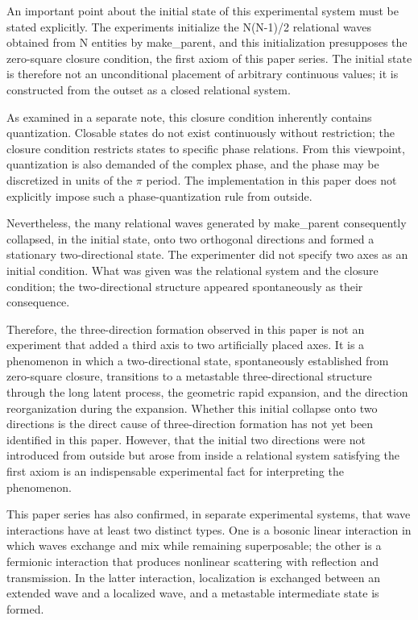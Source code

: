 \documentclass[
  a4paper,
]{article}
\begin{document}
An important point about the initial state of this experimental system
must be stated explicitly. The experiments initialize the N(N-1)/2
relational waves obtained from N entities by make\_parent, and this
initialization presupposes the zero-square closure condition, the first
axiom of this paper series. The initial state is therefore not an
unconditional placement of arbitrary continuous values; it is
constructed from the outset as a closed relational system.

As examined in a separate note, this closure condition inherently
contains quantization. Closable states do not exist continuously without
restriction; the closure condition restricts states to specific phase
relations. From this viewpoint, quantization is also demanded of the
complex phase, and the phase may be discretized in units of the \(\pi\)
period. The implementation in this paper does not explicitly impose such
a phase-quantization rule from outside.

Nevertheless, the many relational waves generated by make\_parent
consequently collapsed, in the initial state, onto two orthogonal
directions and formed a stationary two-directional state. The
experimenter did not specify two axes as an initial condition. What was
given was the relational system and the closure condition; the
two-directional structure appeared spontaneously as their consequence.

Therefore, the three-direction formation observed in this paper is not
an experiment that added a third axis to two artificially placed axes.
It is a phenomenon in which a two-directional state, spontaneously
established from zero-square closure, transitions to a metastable
three-directional structure through the long latent process, the
geometric rapid expansion, and the direction reorganization during the
expansion. Whether this initial collapse onto two directions is the
direct cause of three-direction formation has not yet been identified in
this paper. However, that the initial two directions were not introduced
from outside but arose from inside a relational system satisfying the
first axiom is an indispensable experimental fact for interpreting the
phenomenon.

This paper series has also confirmed, in separate experimental systems,
that wave interactions have at least two distinct types. One is a
bosonic linear interaction in which waves exchange and mix while
remaining superposable; the other is a fermionic interaction that
produces nonlinear scattering with reflection and transmission. In the
latter interaction, localization is exchanged between an extended wave
and a localized wave, and a metastable intermediate state is formed.
\end{document}
